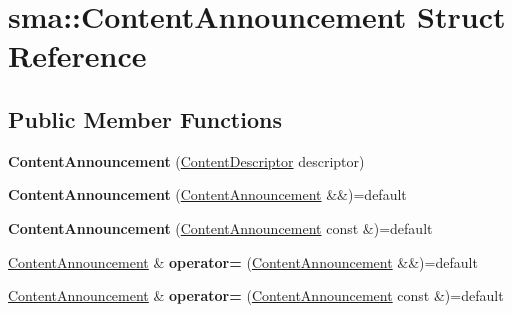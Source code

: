 \hypertarget{structsma_1_1ContentAnnouncement}{\section{sma\-:\-:Content\-Announcement Struct Reference}
\label{structsma_1_1ContentAnnouncement}
}
\subsection*{Public Member Functions}
\begin{DoxyCompactItemize}
\item 
\hypertarget{structsma_1_1ContentAnnouncement_aeeaadbe5d0f4378d4cde8c64aa2f0a54}{{\bfseries Content\-Announcement} (\hyperlink{structsma_1_1ContentDescriptor}{Content\-Descriptor} descriptor)}\label{structsma_1_1ContentAnnouncement_aeeaadbe5d0f4378d4cde8c64aa2f0a54}

\item 
\hypertarget{structsma_1_1ContentAnnouncement_a16a6fe90e1f97ac2a8c10054d41eeafd}{{\bfseries Content\-Announcement} (\hyperlink{structsma_1_1ContentAnnouncement}{Content\-Announcement} \&\&)=default}\label{structsma_1_1ContentAnnouncement_a16a6fe90e1f97ac2a8c10054d41eeafd}

\item 
\hypertarget{structsma_1_1ContentAnnouncement_a71a549f06568c621106b563bc8e60a0b}{{\bfseries Content\-Announcement} (\hyperlink{structsma_1_1ContentAnnouncement}{Content\-Announcement} const \&)=default}\label{structsma_1_1ContentAnnouncement_a71a549f06568c621106b563bc8e60a0b}

\item 
\hypertarget{structsma_1_1ContentAnnouncement_a32c0083cdefadeca2236166299586228}{\hyperlink{structsma_1_1ContentAnnouncement}{Content\-Announcement} \& {\bfseries operator=} (\hyperlink{structsma_1_1ContentAnnouncement}{Content\-Announcement} \&\&)=default}\label{structsma_1_1ContentAnnouncement_a32c0083cdefadeca2236166299586228}

\item 
\hypertarget{structsma_1_1ContentAnnouncement_a03a965794439f198285bf9e0e5ab6b34}{\hyperlink{structsma_1_1ContentAnnouncement}{Content\-Announcement} \& {\bfseries operator=} (\hyperlink{structsma_1_1ContentAnnouncement}{Content\-Announcement} const \&)=default}\label{structsma_1_1ContentAnnouncement_a03a965794439f198285bf9e0e5ab6b34}

\end{DoxyCompactItemize}
